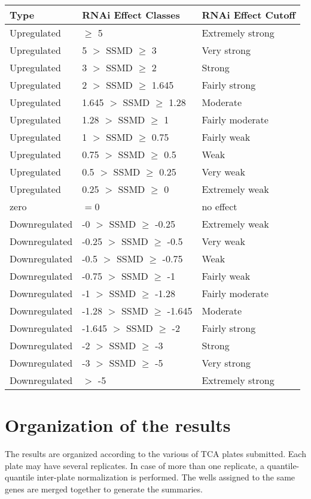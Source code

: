 \documentclass[a4paper,10pt]{article}
\begin{document}
\vspace{1cm}
\begin{tabular}{|l|l|l|}
\hline
 Type    & RNAi Effect Classes                             & RNAi Effect Cutoff \\
\hline
Upregulated &  $\geq$ 5 & Extremely strong\\
Upregulated & 5 $>$ SSMD $\geq$ 3 & Very strong\\
Upregulated & 3 $>$ SSMD $\geq$ 2 & Strong\\
Upregulated & 2 $>$ SSMD $\geq$ 1.645 & Fairly strong\\
Upregulated & 1.645 $>$ SSMD $\geq$ 1.28 & Moderate\\
Upregulated & 1.28 $>$ SSMD $\geq$ 1 & Fairly moderate\\
Upregulated & 1 $>$ SSMD $\geq$ 0.75 & Fairly weak\\
Upregulated & 0.75 $>$ SSMD $\geq$ 0.5 & Weak\\
Upregulated & 0.5 $>$ SSMD $\geq$ 0.25 & Very weak\\
Upregulated & 0.25 $>$ SSMD $\geq$ 0 & Extremely weak\\
zero & $=$0 & no effect \\
Downregulated & -0 $>$ SSMD $\geq$ -0.25 & Extremely weak\\
Downregulated & -0.25 $>$ SSMD $\geq$ -0.5 & Very weak\\
Downregulated & -0.5 $>$ SSMD $\geq$ -0.75 & Weak\\
Downregulated & -0.75 $>$ SSMD $\geq$ -1 & Fairly weak\\
Downregulated & -1 $>$ SSMD $\geq$ -1.28 & Fairly moderate\\
Downregulated & -1.28 $>$ SSMD $\geq$ -1.645 & Moderate\\
Downregulated & -1.645 $>$ SSMD $\geq$ -2 & Fairly strong\\
Downregulated & -2 $>$ SSMD $\geq$ -3 & Strong\\
Downregulated & -3 $>$ SSMD $\geq$ -5 & Very strong\\
Downregulated &  $>$ -5 & Extremely strong\\
\hline
\end{tabular}


\section*{Organization of the results}


The results are organized according to the various of TCA plates submitted. Each plate may have
several replicates. In case of more than one replicate, a quantile-quantile inter-plate normalization
is performed. The wells assigned to the same genes are merged together to generate the summaries.    
\end{document}
